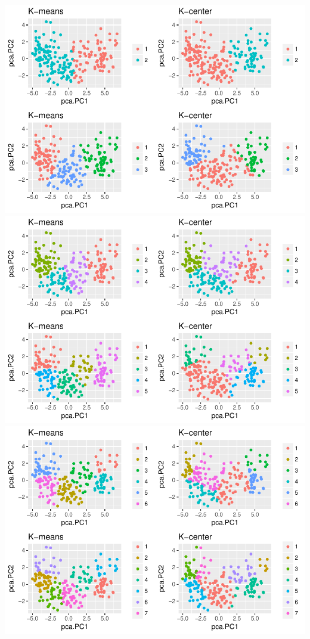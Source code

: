 \documentclass[]{article}
\begin{document}
\includegraphics{Project2_files/figure-latex/unnamed-chunk-6-1.pdf}
\includegraphics{Project2_files/figure-latex/unnamed-chunk-6-2.pdf}
\includegraphics{Project2_files/figure-latex/unnamed-chunk-6-3.pdf}
\end{document}
